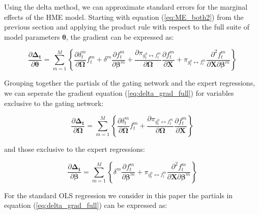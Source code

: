 \documentclass[12pt]{article}
\newcommand{\gateprod}[2]{\pi_{#1 \longleftrightarrow #2}}
\begin{document}
Using the delta method, we can approximate standard
errors for the marginal effects of the HME model. Starting with equation
(\ref{eq:ME_both2}) from the previous section and applying the product rule with
respect to the full suite of model parameters $\boldsymbol{\theta}$, the
gradient can be expressed as:

\begin{equation} \label{eq:delta_grad_full}
  \frac{\partial \boldsymbol{\Delta_{t}}}{\partial \boldsymbol{\theta}} = \sum_{m=1}^{M} \left\{   \frac{\partial \delta^{m}_{t}}{\partial \boldsymbol{\Omega}} f^{m}_{t}   +   \delta^{m} \frac{\partial f^{m}_{t}}{\partial \boldsymbol{\beta}^{m}}   +   \frac{\partial \gateprod{g^{0}_{t}}{f^{m}_{t}}}{\partial \boldsymbol{\Omega}} \frac{\partial f^{m}_{t}}{\partial \boldsymbol{X}}    +   \gateprod{g^{0}_{t}}{f^{m}_{t}}  \frac{\partial^{2} f^{m}_{t}}{\partial \boldsymbol{X} \partial \boldsymbol{\beta}^{m}}   \right\}
\end{equation}

Grouping together the partials of the gating network and the expert regressions,
we can seperate the gradient equation (\ref{eq:delta_grad_full}) for
variables exclusive to the gating network:

\begin{equation} \label{eq:delta_grad_gate}
  \frac{\partial \boldsymbol{\Delta_{t}}}{\partial \boldsymbol{\Omega}} = \sum_{m=1}^{M} \left\{   \frac{\partial \delta^{m}_{t}}{\partial \boldsymbol{\Omega}} f^{m}_{t}   +   \frac{\partial \gateprod{g^{0}_{t}}{f^{m}_{t}}}{\partial \boldsymbol{\Omega}} \frac{\partial f^{m}_{t}}{\partial \boldsymbol{X}}  \right\}
\end{equation}

and those exclusive to the expert regressions:

\begin{equation} \label{eq:delta_grad_experts}
  \frac{\partial \boldsymbol{\Delta_{t}}}{\partial \boldsymbol{\beta}} = \sum_{m=1}^{M} \left\{  \delta^{m} \frac{\partial f^{m}_{t}}{\partial \boldsymbol{\beta}^{m}}   +   \gateprod{g^{0}_{t}}{f^{m}_{t}}  \frac{\partial^{2} f^{m}_{t}}{\partial \boldsymbol{X} \partial \boldsymbol{\beta}^{m}}   \right\}
\end{equation}

For the standard OLS regression we consider in this paper the partials in
equation (\ref{eq:delta_grad_full}) can be expressed as:
\end{document}
